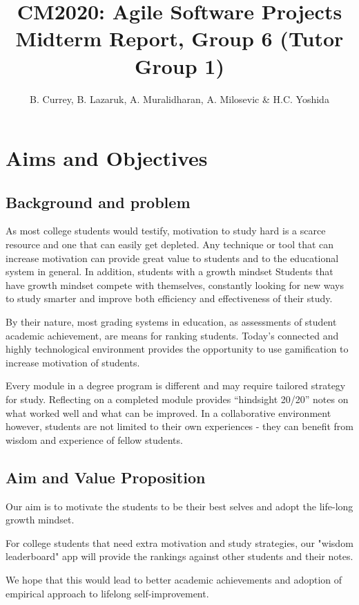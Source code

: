 \title{CM2020: Agile Software Projects \\ Midterm Report, Group 6 (Tutor Group 1)}
\author{B. Currey, B. Lazaruk, A. Muralidharan, A. Milosevic \& H.C. Yoshida}
\graphicspath{{./images/}}




\section{Aims and Objectives}
\subsection{Background and problem}
As most college students would testify, motivation to study hard is a scarce resource and one that can easily get depleted. Any technique or tool that can increase motivation can provide great value to students and to the educational system in general. In addition, students with a growth mindset Students that have growth mindset compete with themselves, constantly looking for new ways to study smarter and improve both efficiency and effectiveness of their study.

By their nature, most grading systems in education, as assessments of student academic achievement, are means for ranking students. Today’s connected and highly technological environment provides the opportunity to use gamification to increase motivation of students. 

Every module in a degree program is different and may require tailored strategy for study. Reflecting on a completed module provides “hindsight 20/20” notes on what worked well and what can be improved. In a collaborative environment however, students are not limited to their own experiences - they can benefit from wisdom and experience of fellow students.

\subsection{Aim and Value Proposition}
Our aim is to motivate the students to be their best selves and adopt the life-long growth mindset.

For college students that need extra motivation and study strategies, our "wisdom leaderboard" app will provide the rankings against other students and their notes.

We hope that this would lead to better academic achievements and adoption of empirical approach to lifelong self-improvement.

